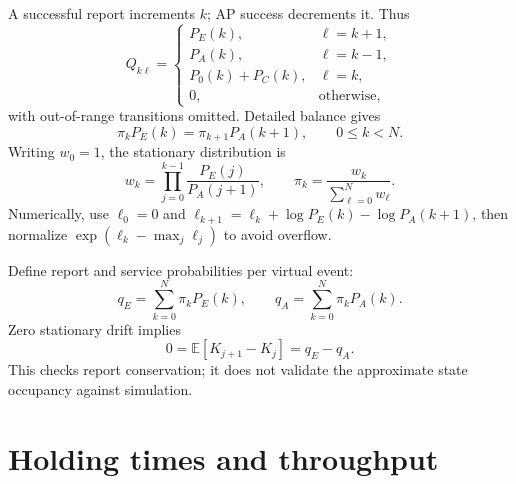 \documentclass[11pt,a4paper]{article}
\newcommand{\avg}[1]{\sum_{k=0}^{N}\pi_k #1}
\begin{document}
A successful report increments $k$; AP success decrements it. Thus
\begin{equation}
Q_{k\ell}=\begin{cases}
P_E(k),&\ell=k+1,\\
P_A(k),&\ell=k-1,\\
P_0(k)+P_C(k),&\ell=k,\\
0,&\text{otherwise},
\end{cases}
\end{equation}
with out-of-range transitions omitted. Detailed balance gives
\begin{equation}
\pi_kP_E(k)=\pi_{k+1}P_A(k+1),\qquad 0\leq k<N.
\end{equation}
Writing $w_0=1$, the stationary distribution is
\begin{equation}
w_k=\prod_{j=0}^{k-1}\frac{P_E(j)}{P_A(j+1)},\qquad
\pi_k=\frac{w_k}{\sum_{\ell=0}^{N}w_\ell}.
\end{equation}
Numerically, use $\ell_0=0$ and
$\ell_{k+1}=\ell_k+\log P_E(k)-\log P_A(k+1)$, then normalize
$\exp(\ell_k-\max_j\ell_j)$ to avoid overflow.

Define report and service probabilities per virtual event:
\begin{equation}
q_E=\avg{P_E(k)},\qquad q_A=\avg{P_A(k)}.
\end{equation}
Zero stationary drift implies
\begin{equation}
0=\mathbb E[K_{j+1}-K_j]=q_E-q_A.
\end{equation}
This checks report conservation; it does not validate the approximate state
occupancy against simulation.

\section{Holding times and throughput}
\end{document}
